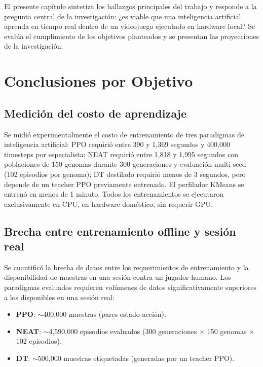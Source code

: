 El presente capítulo sintetiza los hallazgos principales del trabajo y responde a la pregunta central de la investigación: ¿es viable que una inteligencia artificial aprenda en tiempo real dentro de un videojuego ejecutado en hardware local? Se evalúa el cumplimiento de los objetivos planteados y se presentan las proyecciones de la investigación.

\section{Conclusiones por Objetivo}

\subsection{Medición del costo de aprendizaje}

Se midió experimentalmente el costo de entrenamiento de tres paradigmas de inteligencia artificial: PPO requirió entre 390 y 1,369 segundos y 400,000 timesteps por especialista; NEAT requirió entre 1,818 y 1,995 segundos con poblaciones de 150 genomas durante 300 generaciones y evaluación multi-seed (102 episodios por genoma); DT destilado requirió menos de 3 segundos, pero depende de un teacher PPO previamente entrenado. El perfilador KMeans se entrenó en menos de 1 minuto. Todos los entrenamientos se ejecutaron exclusivamente en CPU, en hardware doméstico, sin requerir GPU.

\subsection{Brecha entre entrenamiento offline y sesión real}

Se cuantificó la brecha de datos entre los requerimientos de entrenamiento y la disponibilidad de muestras en una sesión contra un jugador humano. Los paradigmas evaluados requieren volúmenes de datos significativamente superiores a los disponibles en una sesión real:

\begin{itemize}
    \item \textbf{PPO}: $\sim$400,000 muestras (pares estado-acción).
    \item \textbf{NEAT}: $\sim$4,590,000 episodios evaluados (300 generaciones $\times$ 150 genomas $\times$ 102 episodios).
    \item \textbf{DT}: $\sim$500,000 muestras etiquetadas (generadas por un teacher PPO).
\end{itemize}

